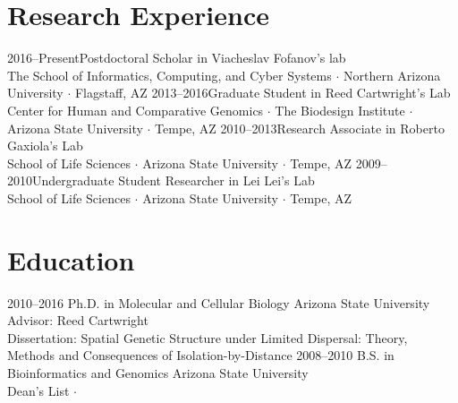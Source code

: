 \documentclass[]{cv-style}          %
\begin{document}
\section{Research Experience}
\begin{entrylist}
\entry
{2016--Present}{Postdoctoral Scholar {\normalfont in Viacheslav Fofanov's lab}}
{\\The School of Informatics, Computing, and Cyber Systems $\cdotp$ Northern Arizona University $\cdotp$ Flagstaff, AZ}{\vspace{-0.3cm}}
\entry
{2013--2016}{Graduate Student {\normalfont in Reed Cartwright's Lab}}
{\\Center for Human and Comparative Genomics $\cdotp$ The Biodesign Institute $\cdotp$ Arizona State University $\cdotp$ Tempe, AZ}{\vspace{-0.3cm}}
\entry
{2010--2013}{Research Associate {\normalfont in Roberto Gaxiola's Lab}}
{\\School of Life Sciences $\cdotp$ Arizona State University $\cdotp$ Tempe, AZ}
{\vspace{-0.3cm}}
\entry
{2009--2010}{Undergraduate Student Researcher {\normalfont in Lei Lei's Lab}}
{\\School of Life Sciences $\cdotp$ Arizona State University $\cdotp$ Tempe, AZ}
{\vspace{-0.3cm}}
\end{entrylist}

\section{Education}

\begin{entrylist}
\entry
{2010--2016}
{Ph.D. {\normalfont in Molecular and Cellular Biology}}
{Arizona State University\\
Advisor: Reed Cartwright\\
Dissertation: Spatial Genetic Structure under Limited Dispersal: Theory, Methods and Consequences of Isolation-by-Distance
}
{\vspace{-0.3cm}}
\entry
{2008--2010}
{B.S. {\normalfont in Bioinformatics and Genomics}}
{Arizona State University\\
Dean's List $\cdotp$  }{\vspace{-0.3cm}}
\end{entrylist}
\end{document}
